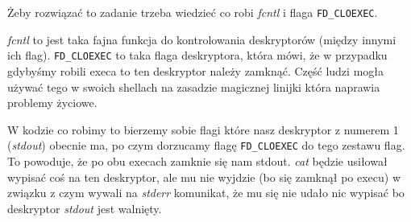 Żeby rozwiązać to zadanie trzeba wiedzieć co robi \textit{fcntl} i flaga \texttt{FD\_CLOEXEC}.

\textit{fcntl} to jest taka fajna funkcja do kontrolowania deskryptorów (między innymi ich flag). \texttt{FD\_CLOEXEC} to taka flaga deskryptora, która mówi, że w przypadku gdybyśmy robili execa to ten deskryptor należy zamknąć. Część ludzi mogła używać tego w swoich shellach na zasadzie magicznej linijki która naprawia problemy życiowe.

W kodzie co robimy to bierzemy sobie flagi które nasz deskryptor z numerem 1 (\textit{stdout}) obecnie ma, po czym dorzucamy flagę \texttt{FD\_CLOEXEC} do tego zestawu flag. To powoduje, że po obu execach zamknie się nam stdout. \textit{cat} będzie usiłował wypisać coś na ten deskryptor, ale mu nie wyjdzie (bo się zamknął po execu) w związku z czym wywali na \textit{stderr} komunikat, że mu się nie udało nic wypisać bo deskryptor \textit{stdout} jest walnięty.

